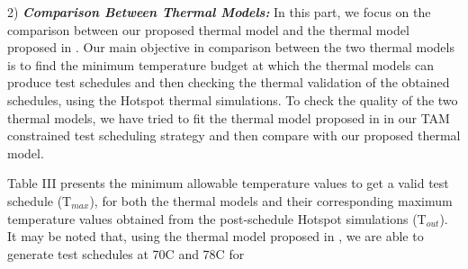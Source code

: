 \documentclass[conference]{IEEEtran}
\begin{document}
	\par
	2) \textbf{\textit{Comparison Between Thermal Models:}} In this part, we
focus on the comparison between our proposed thermal model
and the thermal model proposed in \cite{yao2011power}. Our main objective in
comparison between the two thermal models is to find the
minimum temperature budget at which the thermal models
can produce test schedules and then checking the thermal
validation of the obtained schedules, using the Hotspot thermal
simulations. To check the quality of the two thermal models,
we have tried to fit the thermal model proposed in \cite{yao2011power} in our
TAM constrained test scheduling strategy and then compare
with our proposed thermal model.

	\par
	Table III presents the minimum allowable temperature
values to get a valid test schedule (T$_{max}$), for both the thermal
models and their corresponding maximum temperature values
obtained from the post-schedule Hotspot simulations (T$_{out}$).
It may be noted that, using the thermal model proposed in
\cite{yao2011power}, we are able to generate test schedules at 70\degree C and 78\degree C for
\end{document}
